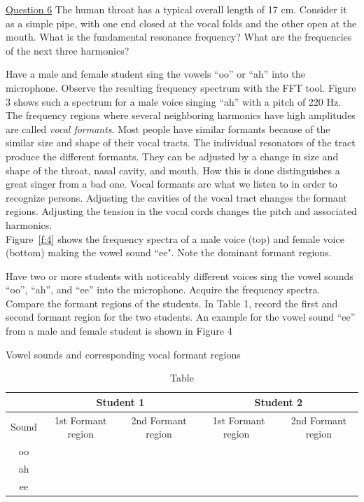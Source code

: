 \documentclass[11pt]{NSF}
\begin{document}
\underline{Question 6} The human throat has a typical overall length of 17 cm. Consider
it as a simple pipe, with one end closed at the vocal folds and the
other open at the mouth. What is the fundamental resonance frequency?
What are the frequencies of the next three harmonics?

Have a male and female student sing the vowels “oo” or “ah” into the microphone. Observe the
resulting frequency spectrum with the FFT tool. Figure 3 shows such a spectrum for a male voice
singing “ah” with a pitch of 220 Hz. \\

The frequency regions where several neighboring harmonics have high
amplitudes are called {\em vocal formants}. Most people have similar
formants because of the similar size and shape of their vocal tracts. 
The individual resonators of the tract produce the different formants.
They can be adjusted by a change in size and shape of the throat,
nasal cavity, and mouth. How this is done distinguishes a great singer
from a bad one. Vocal formants are what we listen to in order to
recognize persons. Adjusting the cavities of the vocal tract changes
the formant regions. Adjusting the tension in the vocal cords changes
the pitch and associated harmonics. \\

Figure~\ref{f:4} shows the frequency spectra of a male voice (top) 
and female voice (bottom) making the vowel sound ``ee".
Note the dominant formant regions.

Have two or more students with noticeably different voices sing the vowel sounds “oo”,
“ah”, and “ee” into the microphone. Acquire the frequency spectra. Compare the formant
regions of the students. In Table 1, record the first and second formant region for the two
students. An example for the vowel sound “ee” from a male and female student is shown in
Figure 4

\begin{table}[hbtp]
\begin{center}
Vowel sounds and corresponding vocal formant regions\\
\begin{tabular}{| c | c | c | c | c | }
\hline
&\multicolumn{2}{c}{Student 1} \vrule
&\multicolumn{2}{c}{Student 2} \vrule\\
\hline
Sound & \phantom{ }1st Formant region \phantom{ } & 2nd Formant region & \phantom{ }1st Formant region\phantom{ }\  & 2nd Formant region\\
\hline
oo &  &  &  &  \\
\hline
ah  &  &  &  &  \\
\hline
ee  &  &  &  &  \\
\hline
\end{tabular}
\caption{Table}
\label{t:1}
\end{center}
\end{table}
\end{document}
